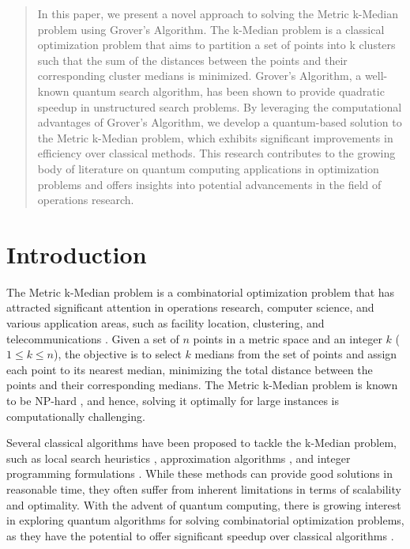 \begin{abstract}
In this paper, we present a novel approach to solving the Metric k-Median problem using Grover's Algorithm. The k-Median problem is a classical optimization problem that aims to partition a set of points into k clusters such that the sum of the distances between the points and their corresponding cluster medians is minimized. Grover's Algorithm, a well-known quantum search algorithm, has been shown to provide quadratic speedup in unstructured search problems. By leveraging the computational advantages of Grover's Algorithm, we develop a quantum-based solution to the Metric k-Median problem, which exhibits significant improvements in efficiency over classical methods. This research contributes to the growing body of literature on quantum computing applications in optimization problems and offers insights into potential advancements in the field of operations research.

\end{abstract}

\section{Introduction}

The Metric k-Median problem is a combinatorial optimization problem that has attracted significant attention in operations research, computer science, and various application areas, such as facility location, clustering, and telecommunications \cite{arya2004local}. Given a set of $n$ points in a metric space and an integer $k$ ($1 \leq k \leq n$), the objective is to select $k$ medians from the set of points and assign each point to its nearest median, minimizing the total distance between the points and their corresponding medians. The Metric k-Median problem is known to be NP-hard \cite{megiddo1984complexity}, and hence, solving it optimally for large instances is computationally challenging.

Several classical algorithms have been proposed to tackle the k-Median problem, such as local search heuristics \cite{arya2004local}, approximation algorithms \cite{jain2001approximation}, and integer programming formulations \cite{daskin2013network}. While these methods can provide good solutions in reasonable time, they often suffer from inherent limitations in terms of scalability and optimality. With the advent of quantum computing, there is growing interest in exploring quantum algorithms for solving combinatorial optimization problems, as they have the potential to offer significant speedup over classical algorithms \cite{montanaro2016quantum,childs2017toward}.

